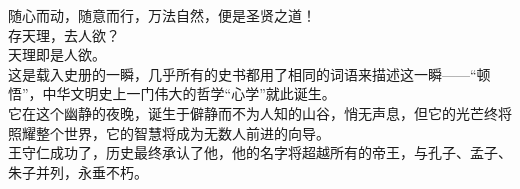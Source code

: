 \begin{multicols}{\theparacolNo}
随心而动，随意而行，万法自然，便是圣贤之道！\\

存天理，去人欲？\\

天理即是人欲。\\

这是载入史册的一瞬，几乎所有的史书都用了相同的词语来描述这一瞬——“顿悟”，中华文明史上一门伟大的哲学“心学”就此诞生。\\

它在这个幽静的夜晚，诞生于僻静而不为人知的山谷，悄无声息，但它的光芒终将照耀整个世界，它的智慧将成为无数人前进的向导。\\

王守仁成功了，历史最终承认了他，他的名字将超越所有的帝王，与孔子、孟子、朱子并列，永垂不朽。\\
\ifnum{}
	\end{multicols}
\fi
\newpage
